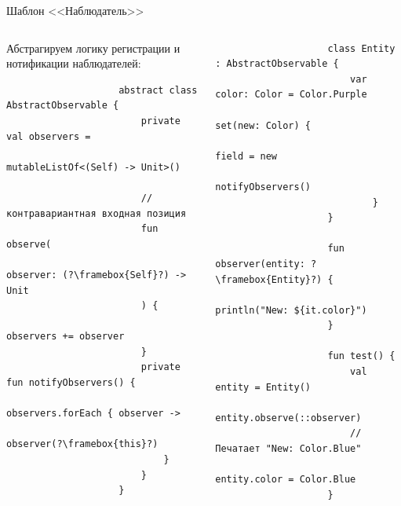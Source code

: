 \documentclass[handout,aspectratio=169,usenames,dvipsnames]{beamer}
\begin{document}
    \begin{frame}[fragile]{Шаблон <<Наблюдатель>>}
        \begin{columns}
            \begin{column}{0.48\textwidth}
                Абстрагируем логику регистрации и нотификации наблюдателей:
                \begin{verbatim}
                    abstract class AbstractObservable {
                        private val observers =
                            mutableListOf<(Self) -> Unit>()

                        // контравариантная входная позиция
                        fun observe(
                            observer: (?\framebox{Self}?) -> Unit
                        ) {
                            observers += observer
                        }
                        private fun notifyObservers() {
                            observers.forEach { observer ->
                                observer(?\framebox{this}?)
                            }
                        }
                    }
                \end{verbatim}
            \end{column}

            \begin{column}{0.49\textwidth}
                \vspace{-0.5em}
                \begin{verbatim}
                    class Entity : AbstractObservable {
                        var color: Color = Color.Purple
                            set(new: Color) {
                                field = new
                                notifyObservers()
                            }
                    }

                    fun observer(entity: ?\framebox{Entity}?) {
                        println("New: ${it.color}")
                    }

                    fun test() {
                        val entity = Entity()
                        entity.observe(::observer)
                        // Печатает "New: Color.Blue"
                        entity.color = Color.Blue
                    }
                \end{verbatim}
            \end{column}
        \end{columns}
    \end{frame}
\end{document}
